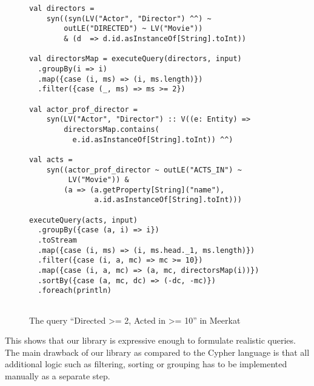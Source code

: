 \begin{figure}[h]
\begin{lstlisting}
val directors = 
    syn((syn(LV("Actor", "Director") ^^) ~ 
        outLE("DIRECTED") ~ LV("Movie"))
        & (d  => d.id.asInstanceOf[String].toInt))
 
val directorsMap = executeQuery(directors, input)
  .groupBy(i => i)
  .map({case (i, ms) => (i, ms.length)})
  .filter({case (_, ms) => ms >= 2})
 
val actor_prof_director = 
    syn(LV("Actor", "Director") :: V((e: Entity) =>
        directorsMap.contains(
          e.id.asInstanceOf[String].toInt)) ^^)
 
val acts = 
    syn((actor_prof_director ~ outLE("ACTS_IN") ~ 
         LV("Movie")) &
        (a => (a.getProperty[String]("name"), 
               a.id.asInstanceOf[String].toInt)))
 
executeQuery(acts, input)
  .groupBy({case (a, i) => i})
  .toStream
  .map({case (i, ms) => (i, ms.head._1, ms.length)})
  .filter({case (i, a, mc) => mc >= 10})
  .map({case (i, a, mc) => (a, mc, directorsMap(i))})
  .sortBy({case (a, mc, dc) => (-dc, -mc)})
  .foreach(println)
    
\end{lstlisting}
\caption{The query ``Directed >= 2, Acted in >= 10'' in Meerkat}
\label{fig:helpers}
\end{figure}


This shows that our library is expressive enough to formulate realistic queries.
The main drawback of our library as compared to the Cypher language is that all additional logic such as
filtering, sorting or grouping has to be implemented manually as a separate step.

